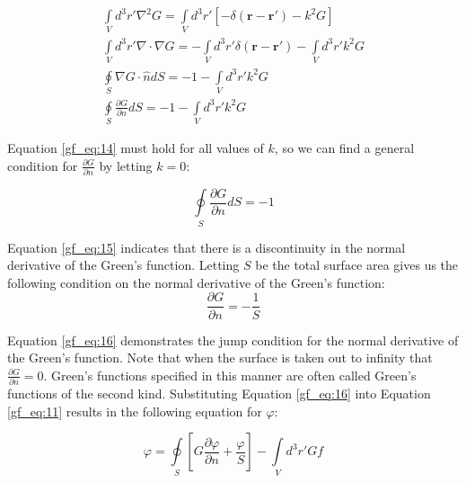 \begin{equation}
\begin{gathered}
\int\limits_{V}d^3r' \nabla^2 G = \int\limits_{V}d^3r'\left[-\delta\left(\mathbf{r}-\mathbf{r}' \right) -k^2G \right] \\
\int\limits_{V}d^3r' \nabla \cdot \nabla G = -\int\limits_{V}d^3r'\delta\left(\mathbf{r}-\mathbf{r}' \right) -\int\limits_{V}d^3r'k^2G \\
\oint\limits_{S}\nabla G \cdot \hat{n} dS  = -1 - \int\limits_{V}d^3r'k^2G\\
\oint\limits_{S}\frac{\partial G}{\partial n} dS = -1 - \int\limits_{V}d^3r' k^2G
\end{gathered}
\label{gf_eq:14}
\end{equation}
\renewcommand{\baselinestretch}{2} \small\normalsize

Equation \ref{gf_eq:14} must hold for all values of $k$, so we can find a general condition for $\frac{\partial G}{\partial n}$ by letting $k = 0$:

\begin{equation}
\oint\limits_{S}\frac{\partial G}{\partial n} dS = -1
\label{gf_eq:15}
\end{equation}
\renewcommand{\baselinestretch}{2} \small\normalsize

Equation \ref{gf_eq:15} indicates that there is a discontinuity in the normal derivative of the Green's function. Letting $S$ be the total surface area gives us the following condition on the normal derivative of the Green's function:
\begin{equation}
\frac{\partial G}{\partial n} = -\frac{1}{S}
\label{gf_eq:16}
\end{equation}
\renewcommand{\baselinestretch}{2} \small\normalsize

Equation \ref{gf_eq:16} demonstrates the jump condition for the normal derivative of the Green's function. Note that when the surface is taken out to infinity that $\frac{\partial G}{\partial n} = 0$. Green's functions specified in this manner are often called Green's functions of the second kind. Substituting Equation \ref{gf_eq:16} into Equation \ref{gf_eq:11} results in the following equation for $\varphi$:

\begin{equation}
\boxed{\varphi = \oint\limits_{S}\left[G\frac{\partial \varphi}{\partial n} + \frac{\varphi}{S} \right] -\int\limits_{V}d^3r' Gf}
\label{gf_eq:17}
\end{equation}
\renewcommand{\baselinestretch}{2} \small\normalsize

